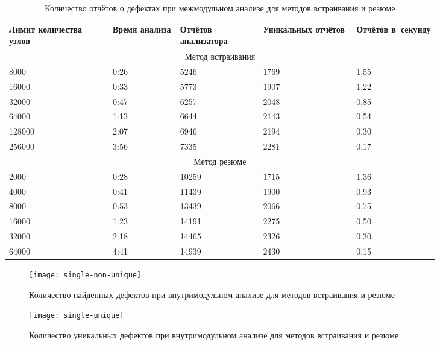 \begin{table}
\renewcommand{\arraystretch}{1.2}
\begin{tabular}{| p{0.2\linewidth} | p{0.13\linewidth} | p{0.16\linewidth} | p{0.18\linewidth} |  p{0.16\linewidth} |} 
\hline
Лимит количества узлов & Время анализа & Отчётов анализатора & Уникальных отчётов & Отчётов в~секунду \\
\hline
\multicolumn{5}{|c|}{Метод встраивания} \\
\hline
\hline
8000      &   0:26       & 5246  & 1769 & 1,55 \\
\hline
16000     &  0:33        & 5773  & 1907 & 1,22 \\
\hline
32000     &  0:47        & 6257  & 2048 & 0,85 \\
\hline
64000     &  1:13        & 6644  & 2143 & 0,54 \\
\hline
128000    &   2:07       & 6946  & 2194 & 0,30 \\
\hline
256000    &   3:56       & 7335  & 2281 & 0,17 \\
\hline
\hline
\multicolumn{5}{|c|}{Метод резюме} \\
\hline
\hline
2000      &   0:28       & 10259  & 1715 & 1,36 \\
\hline
4000      &   0:41       & 11439  & 1900 & 0,93 \\
\hline
8000      &   0:53       & 13439  & 2066 & 0,75 \\
\hline
16000     &  1:23        & 14191  & 2275 & 0,50 \\
\hline
32000     &  2:18        & 14465  & 2326 & 0,30 \\
\hline
64000     &  4:41        & 14939  & 2430 & 0,15 \\
\hline
\hline

\end{tabular}
\caption{Количество отчётов о дефектах при межмодульном анализе для методов встраивания и резюме} \label{table:time-defect-xtu}
\end{table}

\begin{figure}[h]
   \centering
   \texttt{[image: single-non-unique]}
   \caption{Количество найденных дефектов при внутримодульном анализе для методов встраивания и резюме}\label{pic:single-non-unique}
\end{figure}


\begin{figure}[h]
   \centering
   \texttt{[image: single-unique]}
   \caption{Количество уникальных дефектов при внутримодульном анализе для методов встраивания и резюме}\label{pic:single-unique}
\end{figure}



